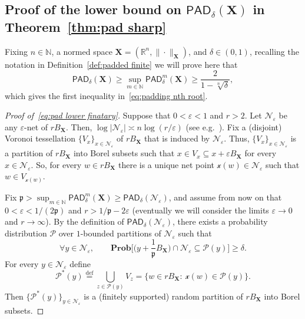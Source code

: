 \documentclass[11pt,reqno]{amsart}
\renewcommand{\ge}{\geqslant}
\renewcommand{\d}{\delta}
\newcommand{\X}{\mathbf X}
\newcommand{\e}{\varepsilon}
\newcommand{\R}{\mathbb R}
\theoremstyle{remark}
\renewcommand{\subset}{\subseteq}
\newcommand{\N}{\mathbb N}
\newcommand{\eqdef}{\stackrel{\mathrm{def}}{=}}
\renewcommand{\Pr}{\mathbf{Prob}}
\renewcommand{\1}{\mathbf 1}
\newcommand{\Part}{\mathscr{P}}
\newcommand{\pad}{\mathsf{PAD}}
\newcommand{\cx}{\mathcal{x}}
\begin{document}
\subsection{Proof of the lower bound on $\pad_\d(\X)$ in Theorem~\ref{thm:pad sharp}}\label{sec:pad lower}
Fixing $n\in \N$, a normed space $\X=(\R^n,\|\cdot\|_{\X})$, and $\d\in (0,1)$, recalling the notation in Definition~\ref{def:padded finite} we will prove here  that
\begin{equation}\label{eq:pad lower finatary}
\pad_\d(\X)\ge \sup_{m\in \N} \pad^m_\d(\X)\ge \frac{2}{1-\sqrt[n]{\d}},
\end{equation}
which gives the first inequality in~\eqref{eq:padding nth root}.


\begin{proof}[Proof of~\eqref{eq:pad lower finatary}] Suppose that $0<\e<1$ and $r>2$.  Let $\mathcal{N}_\e$ be any $\e$-net of $rB_{\X}$. Then, $\log |\mathcal{N}_\e|\asymp n\log (r/\e)$ (see e.g.~\cite[Lemma~9.18]{Ost13}). Fix a (disjoint) Voronoi tessellation $\{V_x\}_{x\in \mathcal{N}_\e}$  of $rB_{\X}$ that is induced by $\mathcal{N}_\e$. Thus, $\{V_x\}_{x\in \mathcal{N}_\e}$ is a partition of $rB_{\X}$ into Borel subsets such that $x\in V_x\subset x+\e B_{\X}$ for every $x\in  \mathcal{N}_\e$. So, for every $w\in rB_{\X}$ there is a unique net point $\cx(w)\in \mathcal{N}_\e$ such that $w\in V_{\cx(w)}$.



Fix ${\mathfrak{p}}>\sup_{m\in \N} \pad^m_\d(\X)\ge\pad_\d(\mathcal{N}_\e)$, and assume from now on that $0<\e<1/(2{\mathfrak{p}})$ and $r>1/{\mathfrak{p}}-2\e$ (eventually we will consider the limits $\e\to 0$ and $r\to \infty$). By the definition of $\pad_\d(\mathcal{N}_\e)$, there exists a probability distribution $\Part$ over $1$-bounded partitions of $\mathcal{N}_\e$ such that
\begin{equation}\label{eq:padding assumption}
\forall  y\in \mathcal{N}_\e,\qquad \Pr\Big[ \Big(y+\frac{1}{{\mathfrak{p}}}B_{\X}\Big)\cap \mathcal{N}_\e \subset\mathscr{P}(y)\Big]\ge \d.
\end{equation}
For every $y\in \mathcal{N}_\e$ define
$$
\Part^*(y)\eqdef \bigcup_{z\in \Part(y)} V_z=\big\{w\in rB_{\X}:\ \cx(w)\in \Part(y)\big\}.
$$
Then $\{\Part^*(y)\}_{y\in \mathcal{N}_\e}$ is a (finitely supported) random partition of $rB_{\X}$ into Borel subsets.




\end{proof}
\end{document}
